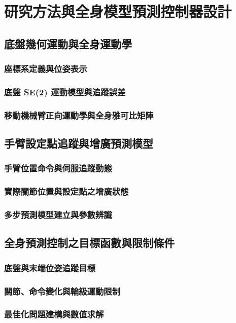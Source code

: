 \chapter{研究方法與全身模型預測控制器設計}
\section{底盤幾何運動與全身運動學}
\subsection{座標系定義與位姿表示}
\subsection{底盤 SE(2) 運動模型與追蹤誤差}
\subsection{移動機械臂正向運動學與全身雅可比矩陣}

\section{手臂設定點追蹤與增廣預測模型}
\subsection{手臂位置命令與伺服追蹤動態}
\subsection{實際關節位置與設定點之增廣狀態}
\subsection{多步預測模型建立與參數辨識}

\section{全身預測控制之目標函數與限制條件}
\subsection{底盤與末端位姿追蹤目標}
\subsection{關節、命令變化與輪級運動限制}
\subsection{最佳化問題建構與數值求解}
